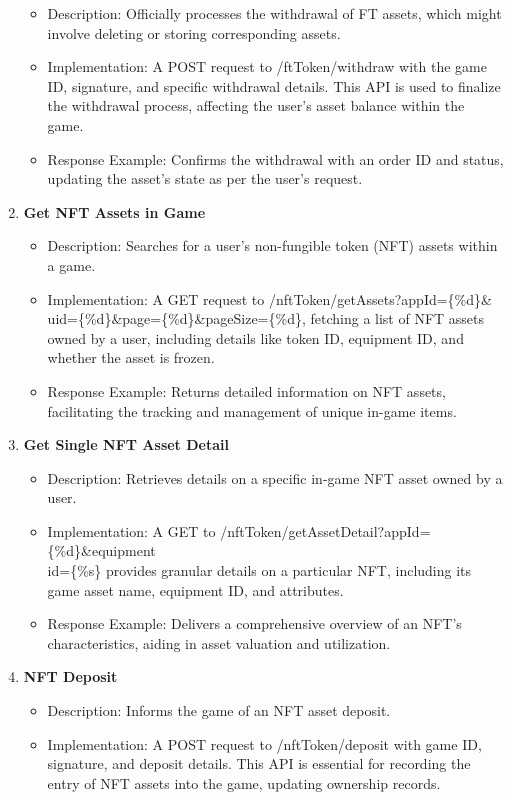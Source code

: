 \begin{enumerate}
\begin{itemize}
        \item Description: Officially processes the withdrawal of FT assets, which might involve deleting or storing corresponding assets.
\item Implementation: A POST request to /ftToken/withdraw with the game ID, signature, and specific withdrawal details. This API is used to finalize the withdrawal process, affecting the user's asset balance within the game.
\item Response Example: Confirms the withdrawal with an order ID and status, updating the asset's state as per the user's request.
\end{itemize}
\item \textbf{Get NFT Assets in Game}
\begin{itemize}
        \item Description: Searches for a user's non-fungible token (NFT) assets within a game.
\item Implementation: A GET request to /nftToken/getAssets?appId=\{\%d\}\&\\
uid=\{\%d\}\&page=\{\%d\}\&pageSize=\{\%d\}, fetching a list of NFT assets owned by a user, including details like token ID, equipment ID, and whether the asset is frozen.
\item Response Example: Returns detailed information on NFT assets, facilitating the tracking and management of unique in-game items.
\end{itemize}
\item \textbf{Get Single NFT Asset Detail}
\begin{itemize}
        \item Description: Retrieves details on a specific in-game NFT asset owned by a user.
\item Implementation: A GET to /nftToken/getAssetDetail?appId=\{\%d\}\&equipment\\
id=\{\%s\} provides granular details on a particular NFT, including its game asset name, equipment ID, and attributes.
\item Response Example: Delivers a comprehensive overview of an NFT's characteristics, aiding in asset valuation and utilization.
\end{itemize}
\item \textbf{NFT Deposit}
\begin{itemize}
        \item Description: Informs the game of an NFT asset deposit.
\item Implementation: A POST request to /nftToken/deposit with game ID, signature, and deposit details. This API is essential for recording the entry of NFT assets into the game, updating ownership records.

\end{itemize}
\end{enumerate}
